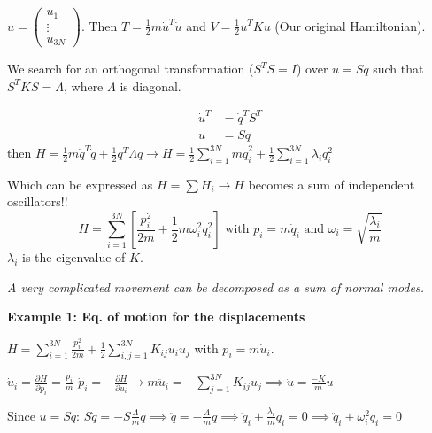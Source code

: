 \documentclass[12pt,a4paper]{report}
\newcommand{\esp}{\vspace{0.5cm}}
\begin{document}
	$u = \begin{pmatrix} u_1 \\ \vdots \\ u_{3N} \end{pmatrix}$. Then $T = \frac{1}{2} m \dot{u}^T \dot{u}$ and $V = \frac{1}{2} u^T K u$ (Our original Hamiltonian).
	
	\esp
	
	We search for an orthogonal transformation ($S^T S = I$) over $u = S q$ such that $S^T K S = \Lambda$, where $\Lambda$ is diagonal.
	
	\esp
	
	\begin{align*}
		\dot{u}^T &= \dot{q}^T S^T \\
		u &= S q
	\end{align*}
	then $H = \frac{1}{2} m \dot{q}^T \dot{q} + \frac{1}{2} q^T \Lambda q \rightarrow H = \frac{1}{2} \sum_{i=1}^{3N} m \dot{q}_i^2 + \frac{1}{2} \sum_{i=1}^{3N} \lambda_i q_i^2$
	
	\esp
	
	Which can be expressed as $H = \sum H_i \rightarrow H$ becomes a sum of independent oscillators!!
	\begin{equation}
		H = \sum_{i=1}^{3N} \left[ \frac{p_i^2}{2m} + \frac{1}{2} m \omega_i^2 q_i^2 \right] \text{ with } p_i = m\dot{q}_i \text{ and } \omega_i = \sqrt{\frac{\lambda_i}{m}}
	\end{equation}
	$\lambda_i$ is the eigenvalue of $K$.
	
	\esp
	
	\noindent \textit{A very complicated movement can be decomposed as a sum of normal modes.}
	
	\esp
	
	\noindent \textbf{Example 1: Eq. of motion for the displacements}
	
	\esp
	
	$H = \sum_{i=1}^{3N} \frac{p_i^2}{2m} + \frac{1}{2} \sum_{i,j=1}^{3N} K_{ij} u_i u_j$ with $p_i = m\dot{u}_i$.
	
	\esp
	
	$\dot{u}_i = \frac{\partial H}{\partial p_i} = \frac{p_i}{m}$
	$\dot{p}_i = -\frac{\partial H}{\partial u_i} \rightarrow m\ddot{u}_i = -\sum_{j=1}^{3N} K_{ij} u_j \implies \ddot{u} = \frac{-K}{m} u$
	
	\esp
	
	Since $u = S q$:
	$S \ddot{q} = -S \frac{\Lambda}{m} q \implies \ddot{q} = -\frac{\Lambda}{m} q \implies \ddot{q}_i + \frac{\lambda_i}{m} q_i = 0 \implies \ddot{q}_i + \omega_i^2 q_i = 0$
	
\end{document}
